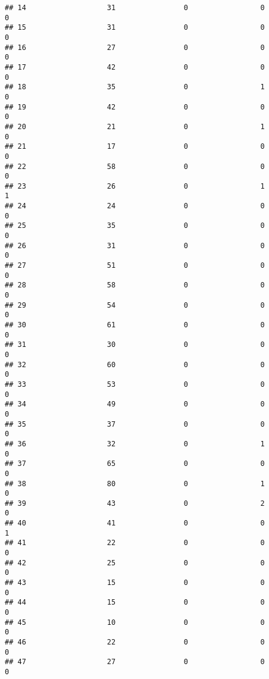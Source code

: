 \documentclass[
]{article}
\begin{document}
\begin{verbatim}
## 14                   31                0                 0              0
## 15                   31                0                 0              0
## 16                   27                0                 0              0
## 17                   42                0                 0              0
## 18                   35                0                 1              0
## 19                   42                0                 0              0
## 20                   21                0                 1              0
## 21                   17                0                 0              0
## 22                   58                0                 0              0
## 23                   26                0                 1              1
## 24                   24                0                 0              0
## 25                   35                0                 0              0
## 26                   31                0                 0              0
## 27                   51                0                 0              0
## 28                   58                0                 0              0
## 29                   54                0                 0              0
## 30                   61                0                 0              0
## 31                   30                0                 0              0
## 32                   60                0                 0              0
## 33                   53                0                 0              0
## 34                   49                0                 0              0
## 35                   37                0                 0              0
## 36                   32                0                 1              0
## 37                   65                0                 0              0
## 38                   80                0                 1              0
## 39                   43                0                 2              0
## 40                   41                0                 0              1
## 41                   22                0                 0              0
## 42                   25                0                 0              0
## 43                   15                0                 0              0
## 44                   15                0                 0              0
## 45                   10                0                 0              0
## 46                   22                0                 0              0
## 47                   27                0                 0              0

\end{verbatim}
\end{document}
